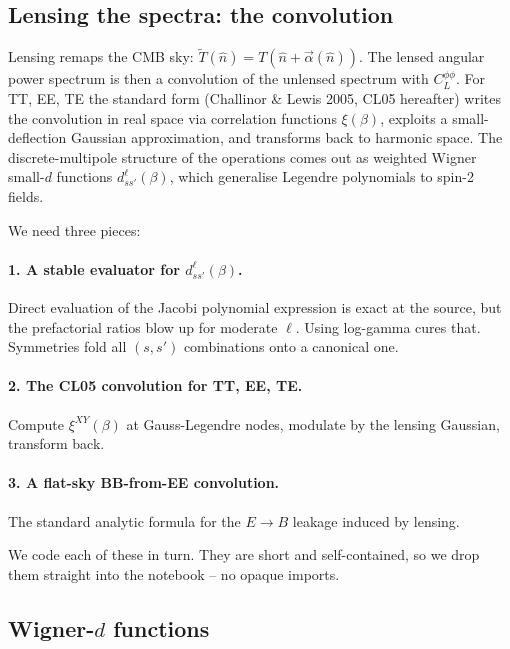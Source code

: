\subsection{Lensing the spectra: the convolution}

Lensing remaps the CMB sky: $\tilde T(\hat n) = T(\hat n + \vec\alpha(\hat n))$. The lensed angular power spectrum is then a convolution of the unlensed spectrum with $C_L^{\phi\phi}$. For TT, EE, TE the standard form (Challinor \& Lewis 2005, CL05 hereafter) writes the convolution in real space via correlation functions $\xi(\beta)$, exploits a small-deflection Gaussian approximation, and transforms back to harmonic space. The discrete-multipole structure of the operations comes out as weighted Wigner small-$d$ functions $d^\ell_{ss'}(\beta)$, which generalise Legendre polynomials to spin-2 fields.

We need three pieces:

\paragraph{1. A stable evaluator for $d^\ell_{ss'}(\beta)$.} Direct evaluation of the Jacobi polynomial expression is exact at the source, but the prefactorial ratios blow up for moderate $\ell$. Using log-gamma cures that. Symmetries fold all $(s, s')$ combinations onto a canonical one.

\paragraph{2. The CL05 convolution for TT, EE, TE.} Compute $\xi^{XY}(\beta)$ at Gauss-Legendre nodes, modulate by the lensing Gaussian, transform back.

\paragraph{3. A flat-sky BB-from-EE convolution.} The standard analytic formula for the $E\to B$ leakage induced by lensing.

We code each of these in turn. They are short and self-contained, so we drop them straight into the notebook -- no opaque imports.

\subsection{Wigner-$d$ functions}

